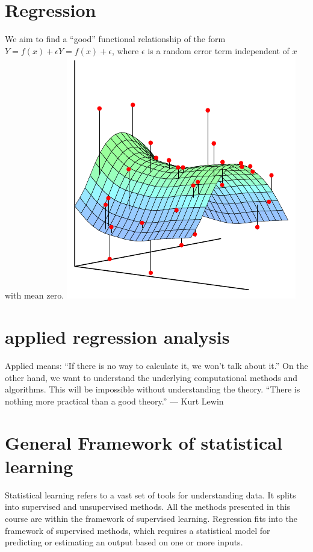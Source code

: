 \documentclass[11pt]{article}
\begin{document}
\section{Regression}\label{sec:Regression}
We aim to find a ``good'' functional relationship of the form $Y=f(x)+\epsilon Y = f(x) + \epsilon$, where $\epsilon$ is a random error term independent of $x$ with mean zero.
\includegraphics{images/figure-1-1-1}
\blindtext

\section{applied regression analysis}\label{sec:applied regression analysis}
Applied means: ``If there is no way to calculate it, we won't talk about it.''
On the other hand, we want to understand the underlying computational methods and algorithms.
This will be impossible without understanding the theory.
``There is nothing more practical than a good theory.''
— Kurt Lewin
\blindtext

\section{General Framework of statistical learning}\label{sec:General-framework-of-statistical-learning}
Statistical learning refers to a vast set of tools for understanding data.
It splits into supervised and unsupervised methods.
All the methods presented in this course are within the framework of supervised learning.
Regression fits into the framework of supervised methods, which requires a statistical model for predicting or estimating an output based on one or more inputs.
\end{document}
